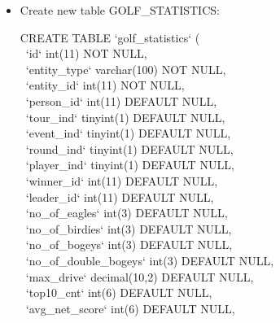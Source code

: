 \documentclass[titlepage]{article}
\begin{document}
\begin{itemize}
\vspace{1em}
\newpage
\item Create new table GOLF\_STATISTICS: \vspace{1em}

\hspace{15pt}CREATE TABLE `golf\_statistics` ( \\
\-\ \hspace{30pt}`id` int(11) NOT NULL, \\
\-\ \hspace{30pt}`entity\_type` varchar(100) NOT NULL, \\
\-\ \hspace{30pt}`entity\_id` int(11) NOT NULL, \\
\-\ \hspace{30pt}`person\_id` int(11) DEFAULT NULL, \\
\-\ \hspace{30pt}`tour\_ind` tinyint(1) DEFAULT NULL, \\
\-\ \hspace{30pt}`event\_ind` tinyint(1) DEFAULT NULL, \\
\-\ \hspace{30pt}`round\_ind` tinyint(1) DEFAULT NULL, \\
\-\ \hspace{30pt}`player\_ind` tinyint(1) DEFAULT NULL, \\
\-\ \hspace{30pt}`winner\_id` int(11) DEFAULT NULL, \\
\-\ \hspace{30pt}`leader\_id` int(11) DEFAULT NULL, \\
\-\ \hspace{30pt}`no\_of\_eagles` int(3) DEFAULT NULL, \\
\-\ \hspace{30pt}`no\_of\_birdies` int(3) DEFAULT NULL, \\
\-\ \hspace{30pt}`no\_of\_bogeys` int(3) DEFAULT NULL, \\
\-\ \hspace{30pt}`no\_of\_double\_bogeys` int(3) DEFAULT NULL, \\
\-\ \hspace{30pt}`max\_drive` decimal(10,2) DEFAULT NULL, \\
\-\ \hspace{30pt}`top10\_cnt` int(6) DEFAULT NULL, \\
\-\ \hspace{30pt}`avg\_net\_score` int(6) DEFAULT NULL, \\

\end{itemize}
\end{document}
